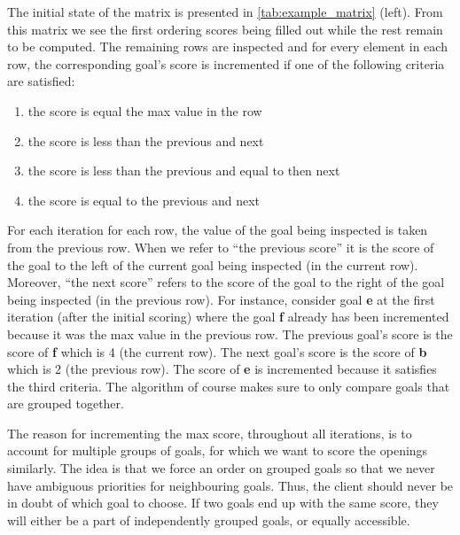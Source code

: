 The initial state of the matrix is presented in \cref{tab:example_matrix} (left).
From this matrix we see the first ordering scores being filled out while the rest remain to be computed.
The remaining rows are inspected and for every element in each row, the corresponding goal's score is incremented if one of the following criteria are satisfied:
%
\begin{enumerate}
  \item the score is equal the max value in the row
  \item the score is less than the previous and next
  \item the score is less than the previous and equal to then next
  \item the score is equal to the previous and next
\end{enumerate}
%
For each iteration for each row, the value of the goal being inspected is taken from the previous row.
When we refer to ``the previous score'' it is the score of the goal to the left of the current goal being inspected (in the current row).
Moreover, ``the next score'' refers to the score of the goal to the right of the goal being inspected (in the previous row).
For instance, consider goal \textbf{e} at the first iteration (after the initial scoring) where the goal \textbf{f} already has been incremented because it was the max value in the previous row.
The previous goal's score is the score of \textbf{f} which is 4 (the current row).
The next goal's score is the score of \textbf{b} which is 2 (the previous row).
The score of \textbf{e} is incremented because it satisfies the third criteria.
The algorithm of course makes sure to only compare goals that are grouped together.
%

The reason for incrementing the max score, throughout all iterations, is to account for multiple groups of goals, for which we want to score the openings similarly.
The idea is that we force an order on grouped goals so that we never have ambiguous priorities for neighbouring goals.
Thus, the client should never be in doubt of which goal to choose.
If two goals end up with the same score, they will either be a part of independently grouped goals, or equally accessible.

